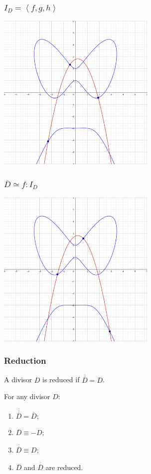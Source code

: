 \documentclass{beamer}
\newcommand{\pid}[1]{\left\langle #1 \right\rangle}
\renewcommand{\bar}{\overline}
\begin{document}
\begin{frame}
\frametitle{$I_D = \pid{f, g, h}$}
  \begin{center} \includegraphics[height=7.6cm]{d1_f.png} \end{center}
\end{frame}
\begin{frame}
\frametitle{$\bar D \simeq f : I_D$}
  \begin{center} \includegraphics[height=7.6cm]{flip_d1.png} \end{center}
\end{frame}


\begin{frame}
\frametitle{Reduction}
  \begin{definition}
    A divisor $D$ is reduced if $\bar{\bar D} = D$.
  \end{definition}
  \begin{theorem}
    For any divisor $D$:
    \begin{enumerate}
      \item $\bar{\bar{\bar D}} = \bar D$;
      \item $\bar D \equiv -D$;
      \item $\bar{\bar D} \equiv D$;
      \item $\bar D$ and $\bar{\bar D}$ are reduced.
    \end{enumerate}
  \end{theorem}
\end{frame}
\end{document}
